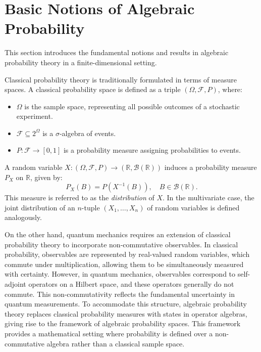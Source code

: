 \documentclass[a4paper,11pt]{article}
\begin{document}
\section{Basic Notions of Algebraic Probability}\label{ch_2}

This section introduces the fundamental notions and results in algebraic probability theory in a finite-dimensional setting.

\bigskip

Classical probability theory is traditionally formulated in terms of measure spaces. A classical probability space is defined as a triple $(\Omega, \mathcal{F}, P)$, where:
\begin{itemize}
    \item $\Omega$ is the sample space, representing all possible outcomes of a stochastic experiment.
    \item $\mathcal{F} \subseteq 2^{\Omega}$ is a $\sigma$-algebra of events.
    \item $P: \mathcal{F} \to [0,1]$ is a probability measure assigning probabilities to events.
\end{itemize}
A random variable $X: (\Omega, \mathcal{F}, P) \to (\mathbb{R}, \mathcal{B}(\mathbb{R}))$ induces a probability measure $P_X$ on $\mathbb{R}$, given by:
\begin{equation}
    P_X(B) = P(X^{-1}(B)), \quad B \in \mathcal{B}(\mathbb{R}).
\end{equation}
This measure is referred to as the \emph{distribution} of $X$. In the multivariate case, the joint distribution of an $n$-tuple $(X_1, \dots, X_n)$ of random variables is defined analogously.

\bigskip

On the other hand, quantum mechanics requires an extension of classical probability theory to incorporate non-commutative observables. In classical probability, observables are represented by real-valued random variables, which commute under multiplication, allowing them to be simultaneously measured with certainty. However, in quantum mechanics, observables correspond to self-adjoint operators on a Hilbert space, and these operators generally do not commute. This non-commutativity reflects the fundamental uncertainty in quantum measurements. To accommodate this structure, algebraic probability theory replaces classical probability measures with states in operator algebras, giving rise to the framework of algebraic probability spaces. This framework provides a mathematical setting where probability is defined over a non-commutative algebra rather than a classical sample space. 
\end{document}
